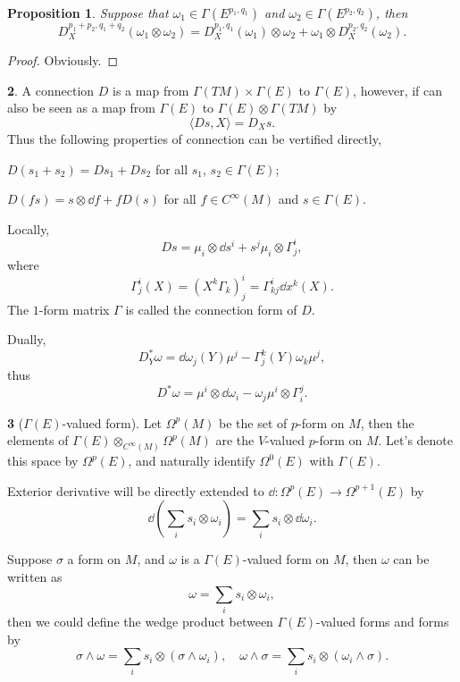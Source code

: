 \documentclass[11pt]{article}
\theoremstyle{definition}
\newtheorem{para}{}[part]
\theoremstyle{plain}
\newtheorem{pro}[para]{Proposition}
\begin{document}
\begin{pro}
Suppose that $\omega_1\in \Gamma(E^{p_1,q_1})$ and $\omega_2\in \Gamma(E^{p_2,q_2})$, then 
\[
	D^{p_1+p_2,q_1+q_2}_X(\omega_1\otimes \omega_2)=D^{p_1,q_1}_X(\omega_1)\otimes \omega_2+\omega_1\otimes D^{p_2,q_2}_X(\omega_2).
\]
\end{pro}

\begin{proof}
Obviously.
\end{proof}

\begin{para}
A connection $D$ is a map from $\Gamma(TM)\times \Gamma(E)$ to $\Gamma(E)$, however, if can also be seen as a map from $\Gamma(E)$ to $\Gamma(E)\otimes \Gamma(TM)$ by
\[
	\langle Ds,X\rangle=D_Xs.
\]
Thus the following properties of connection can be vertified directly,
\begin{compactenum}
	\item $D(s_1+s_2)=Ds_1+Ds_2$ for all $s_1$, $s_2\in \Gamma(E)$;
	\item $D(fs)=s\otimes \dd f+fD(s)$ for all $f\in C^\infty (M)$ and $s\in \Gamma(E)$.
\end{compactenum}
\end{para}

Locally, 
\[
	Ds=\mu_i\otimes \dd s^i+s^j\mu_i\otimes \Gamma^i_j,
\]
where 
\[
	\Gamma^i_j(X)=(X^k\Gamma_{k})^i_j=\Gamma^i_{kj}\dd x^k(X).
\]
The $1$-form matrix $\Gamma$ is called the connection form of $D$.

Dually, 
\[
	D_Y^*\omega = \dd \omega_j(Y)\mu^j-\Gamma^k_j(Y)\omega_k \mu^j,
\]
thus
\[
	D^*\omega= \mu^i \otimes \dd \omega_i-\omega_j \mu^i\otimes \Gamma^j_i.
\]

\begin{para}[$\Gamma(E)$-valued form]
Let $\Omega^p(M)$ be the set of $p$-form on $M$, then the elements of $\Gamma(E)\otimes_{C^\infty(M)} \Omega^p(M)$ are the $V$-valued $p$-form on $M$. Let's denote this space by $\Omega^p(E)$, and naturally identify $\Omega^0(E)$ with $\Gamma(E)$. 

Exterior derivative will be directly extended to $\dd:\Omega^p(E)\to \Omega^{p+1}(E)$ by
\[
	\dd\left(\sum_i s_i\otimes \omega_i\right)=\sum_i s_i\otimes \dd \omega_i.
\]

Suppose $\sigma$ a form on $M$, and $\omega$ is a $\Gamma(E)$-valued form on $M$, then $\omega$ can be written as
\[
	\omega=\sum_i s_i\otimes \omega_i,
\]
then we could define the wedge product between $\Gamma(E)$-valued forms and forms by
\[
	\sigma\wedge \omega =\sum_i s_i\otimes (\sigma\wedge\omega_i),\quad \omega\wedge \sigma =\sum_i s_i\otimes (\omega_i\wedge \sigma).
\]
\end{para}
\end{document}
